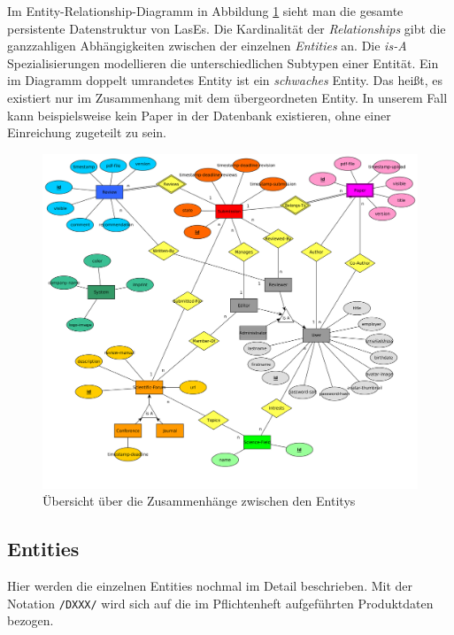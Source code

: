 
Im Entity-Relationship-Diagramm in Abbildung \ref{er:diagramm} sieht man die gesamte persistente Datenstruktur von LasEs. Die Kardinalität der \emph{Relationships} gibt die ganzzahligen Abhängigkeiten zwischen der einzelnen \emph{Entities} an. Die \emph{is-A} Spezialisierungen modellieren die unterschiedlichen Subtypen einer Entität. Ein im Diagramm doppelt umrandetes Entity ist ein \emph{schwaches} Entity. Das heißt, es existiert nur im Zusammenhang mit dem übergeordneten Entity. In unserem Fall kann beispielsweise kein Paper in der Datenbank existieren, ohne einer Einreichung zugeteilt zu sein.

\begin{figure}[H]
	\centering
	\includegraphics[width=\linewidth]{graphics/ER-Modell}
	\caption{Übersicht über die Zusammenhänge zwischen den Entitys}
	\label{er:diagramm}
\end{figure}

\subsection{Entities}

Hier werden die einzelnen Entities nochmal im Detail beschrieben. Mit der Notation \texttt{/DXXX/} wird sich auf die im Pflichtenheft aufgeführten Produktdaten bezogen.

